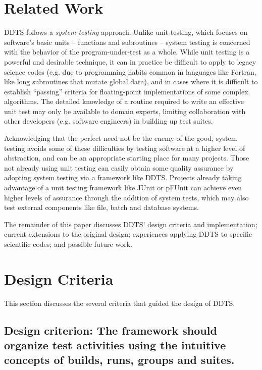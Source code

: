 \documentclass[conference]{IEEEtran}
\begin{document}
\section{Related Work}

DDTS follows a \emph{system testing} approach. Unlike unit testing, which focuses on software's basic units -- functions and subroutines -- system testing is concerned with the behavior of the program-under-test as a whole. While unit testing is a powerful and desirable technique, it can in practice be difficult to apply to legacy science codes \cite{clune} (e.g. due to programming habits common in languages like Fortran, like long subroutines that mutate global data), and in cases where it is difficult to establish ``passing'' criteria for floating-point implementations of some complex algorithms. The detailed knowledge of a routine required to write an effective unit test may only be available to domain experts, limiting collaboration with other developers (e.g. software engineers) in building up test suites.

Acknowledging that the perfect need not be the enemy of the good, system testing avoids some of these difficulties by testing software at a higher level of abstraction, and can be an appropriate starting place for many projects. Those not already using unit testing can easily obtain some quality assurance by adopting system testing via a framework like DDTS. Projects already taking advantage of a unit testing framework like JUnit \cite{junit} or pFUnit \cite{pfunit} can achieve even higher levels of assurance through the addition of system tests, which may also test external components like file, batch and database systems.

The remainder of this paper discusses DDTS' design criteria and implementation; current extensions to the original design; experiences applying DDTS to specific scientific codes; and possible future work.

\section{Design Criteria}
This section discusses the several criteria that guided the design of DDTS.

\subsection{Design criterion: The framework should organize test activities using the intuitive concepts of builds, runs, groups and suites.}
\end{document}
